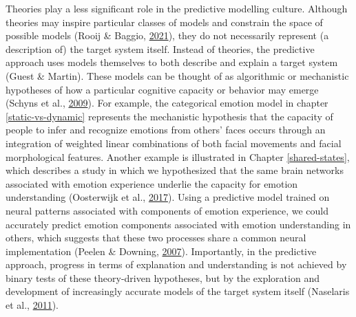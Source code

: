 \documentclass[11pt,american,a4paper,oneside,]{memoir} %
\begin{document}
Theories play a less significant role in the predictive modelling culture. Although theories may inspire particular classes of models and constrain the space of possible models (Rooij \& Baggio, \protect\hyperlink{ref-Van_Rooij2021-bk}{2021}), they do not necessarily represent (a description of) the target system itself. Instead of theories, the predictive approach uses models themselves to both describe and explain a target system (Guest \& Martin\protect\hyperlink{ref-Guest2020-ef}{}). These models can be thought of as algorithmic or mechanistic hypotheses of how a particular cognitive capacity or behavior may emerge (Schyns et al., \protect\hyperlink{ref-schyns2009information}{2009}). For example, the categorical emotion model in chapter \ref{static-vs-dynamic} represents the mechanistic hypothesis that the capacity of people to infer and recognize emotions from others' faces occurs through an integration of weighted linear combinations of both facial movements and facial morphological features. Another example is illustrated in Chapter \ref{shared-states}, which describes a study in which we hypothesized that the same brain networks associated with emotion experience underlie the capacity for emotion understanding (Oosterwijk et al., \protect\hyperlink{ref-Oosterwijk2017-sc}{2017}). Using a predictive model trained on neural patterns associated with components of emotion experience, we could accurately predict emotion components associated with emotion understanding in others, which suggests that these two processes share a common neural implementation (Peelen \& Downing, \protect\hyperlink{ref-Peelen2007-ew}{2007}). Importantly, in the predictive approach, progress in terms of explanation and understanding is not achieved by binary tests of these theory-driven hypotheses, but by the exploration and development of increasingly accurate models of the target system itself (Naselaris et al., \protect\hyperlink{ref-Naselaris2011-oh}{2011}).
\end{document}
